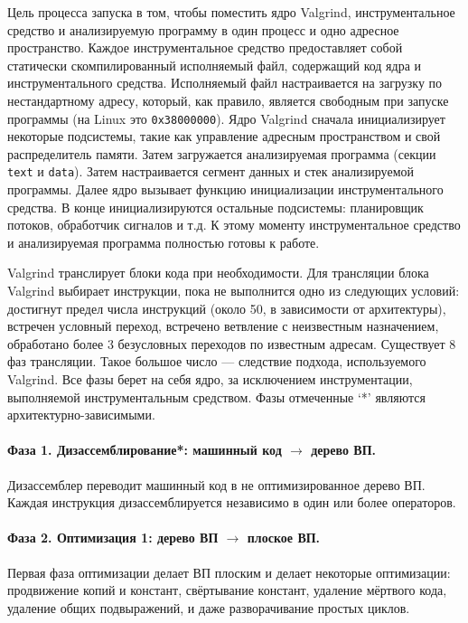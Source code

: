 \documentclass[a4paper,12pt,russian]{article}
\begin{document}
Цель процесса запуска в том, чтобы поместить ядро Valgrind, инструментальное средство и анализируемую программу в один процесс и одно адресное пространство. Каждое инструментальное средство предоставляет собой статически скомпилированный исполняемый файл, содержащий код ядра и инструментального средства. Исполняемый файл настраивается на загрузку по нестандартному адресу, который, как правило, является свободным при запуске программы (на Linux это \texttt{0x38000000}). Ядро Valgrind сначала инициализирует некоторые подсистемы, такие как управление адресным пространством и свой распределитель памяти. Затем загружается анализируемая программа (секции \texttt{text} и \texttt{data}). Затем настраивается сегмент данных и стек анализируемой программы. Далее ядро вызывает функцию инициализации инструментального средства. В конце инициализируются остальные подсистемы: планировщик потоков, обработчик сигналов и т.д. К этому моменту инструментальное средство и анализируемая программа полностью готовы к работе.

Valgrind транслирует блоки кода при необходимости. Для трансляции блока Valgrind выбирает инструкции, пока не выполнится одно из следующих условий: достигнут предел числа инструкций (около 50, в зависимости от архитектуры), встречен условный переход, встречено ветвление с неизвестным назначением, обработано более 3 безусловных переходов по известным адресам. Существует 8 фаз трансляции. Такое большое число --- следствие подхода, используемого Valgrind. Все фазы берет на себя ядро, за исключением инструментации, выполняемой инструментальным средством. Фазы отмеченные `*' являются архитектурно-зависимыми.

\paragraph{Фаза 1. Дизассемблирование*: машинный код $\to$ дерево ВП.}
Дизассемблер переводит машинный код в не оптимизированное дерево ВП. Каждая инструкция дизассемблируется независимо в один или более операторов.

\paragraph{Фаза 2. Оптимизация 1: дерево ВП $\to$ плоское ВП.}
Первая фаза оптимизации делает ВП плоским и делает некоторые оптимизации: продвижение копий и констант, свёртывание констант, удаление мёртвого кода, удаление общих подвыражений, и даже разворачивание простых циклов.
\end{document}
